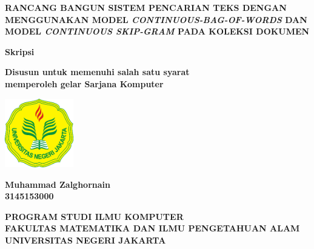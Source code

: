 \documentclass[12pt]{report}
\begin{document}
\begin{titlepage}
	\begin{center}
	\singlespacing
	\vspace*{1cm}
	\textbf{\fontsize{16pt}{\baselineskip}\selectfont
		RANCANG BANGUN SISTEM PENCARIAN TEKS DENGAN MENGGUNAKAN MODEL \textit{CONTINUOUS-BAG-OF-WORDS} DAN MODEL \textit{CONTINUOUS SKIP-GRAM} PADA KOLEKSI DOKUMEN}

	\vspace{1.8cm}
	\textbf{\fontsize{14pt}{\baselineskip}\selectfont 
		Skripsi}
        
	\vspace{1.8cm}
	\textbf{\fontsize{14pt}{\baselineskip}\selectfont
		Disusun untuk memenuhi salah satu syarat \\memperoleh gelar Sarjana Komputer}
            
	\vspace{1.8cm}

       	\includegraphics[width=3cm]{logounj}

	\vspace{1.5cm}
            
	\textbf{\fontsize{14pt}{\baselineskip}\selectfont
		Muhammad Zalghornain \\ 3145153000}
            
	\vspace{2.5cm}
     
	\textbf{\fontsize{13pt}{\baselineskip}\selectfont
	PROGRAM STUDI ILMU KOMPUTER\\
	FAKULTAS MATEMATIKA DAN ILMU PENGETAHUAN ALAM\\
	UNIVERSITAS NEGERI JAKARTA}
            
	\vspace{0.8cm}
	\textbf{\fontsize{12pt}{\baselineskip}}
	
	\end{center}
\end{titlepage}


\cleardoublepage
{}


%
\end{document}
